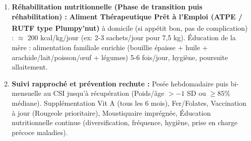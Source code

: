 \documentclass[11pt]{article}
\begin{document}
\begin{corrige}
\begin{enumerate}
\begin{enumerate}
        \item \textbf{Réhabilitation nutritionnelle (Phase de transition puis réhabilitation) :} \textbf{Aliment Thérapeutique Prêt à l'Emploi (ATPE / RUTF type Plumpy'nut\textsuperscript{\textregistered})} à domicile (si appétit bon, pas de complication) : $\approx$ 200 kcal/kg/jour (ex: 2-3 sachets/jour pour 7,5 kg). Éducation de la mère : alimentation familiale enrichie (bouillie épaisse + huile + arachide/lait/poisson/œuf + légumes) 5-6 fois/jour, hygiène, poursuite allaitement.
        \item \textbf{Suivi rapproché et prévention rechute :} Pesée hebdomadaire puis bi-mensuelle au CSI jusqu'à récupération (Poids/âge $> -1$ SD ou $\ge 85\%$ médiane). Supplémentation Vit A (tous les 6 mois), Fer/Folates, Vaccination à jour (Rougeole prioritaire), Moustiquaire imprégnée, Éducation nutritionnelle continue (diversification, fréquence, hygiène, prise en charge précoce maladies).
    \end{enumerate}
\end{enumerate}
\end{corrige}
\end{document}
